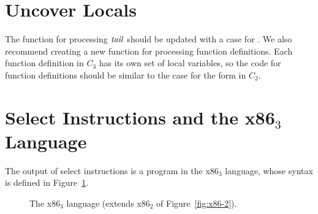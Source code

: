 \documentclass[11pt]{book}
\newcommand{\gray}[1]{{\color{gray} #1}}
\begin{document}
\section{Uncover Locals}
\label{sec:uncover-locals-r4}

The function for processing $\mathit{tail}$ should be updated with a case for
. We also recommend creating a new function for
processing function definitions. Each function definition in $C_3$ has
its own set of local variables, so the code for function definitions
should be similar to the case for the  form in $C_2$.

\section{Select Instructions and the x86$_3$ Language}
\label{sec:select-r4}

The output of select instructions is a program in the x86$_3$
language, whose syntax is defined in Figure~\ref{fig:x86-3}.

\begin{figure}[tp]
\fbox{
\begin{minipage}{0.96\textwidth}
\[
\begin{array}{lcl}
\Arg &::=&  \gray{  \INT{\Int} \mid \REG{\Reg}
    \mid (\key{deref}\,\Reg\,\Int) } \\
   &\mid& \gray{ (\key{byte-reg}\; \Reg) 
    \mid   (\key{global-value}\; \itm{name})  } \\
   &\mid& (\key{fun-ref}\; \itm{label})\\
\itm{cc} & ::= & \gray{  \key{e} \mid \key{l} \mid \key{le} \mid \key{g} \mid \key{ge}  } \\
\Instr &::=& \gray{  (\key{addq} \; \Arg\; \Arg) \mid
             (\key{subq} \; \Arg\; \Arg) \mid
             (\key{negq} \; \Arg) \mid (\key{movq} \; \Arg\; \Arg)  } \\
      &\mid& \gray{  (\key{callq} \; \mathit{label}) \mid
             (\key{pushq}\;\Arg) \mid
             (\key{popq}\;\Arg) \mid
             (\key{retq})  } \\
       &\mid& \gray{  (\key{xorq} \; \Arg\;\Arg)
       \mid (\key{cmpq} \; \Arg\; \Arg) \mid (\key{set}\itm{cc} \; \Arg)  } \\
       &\mid& \gray{  (\key{movzbq}\;\Arg\;\Arg)
       \mid  (\key{jmp} \; \itm{label})
       \mid (\key{j}\itm{cc} \; \itm{label})
       \mid (\key{label} \; \itm{label})  } \\
     &\mid& (\key{indirect-callq}\;\Arg ) \mid (\key{tail-jmp}\;\Arg) \\
     &\mid& (\key{leaq}\;\Arg\;\Arg)\\
\Block &::= & \gray{(\key{block} \;\itm{info}\; \Instr^{+})} \\
\Def &::= & (\key{define} \; (\itm{label}) \;\itm{info}\; ((\itm{label} \,\key{.}\, \Block)^{+}))\\
x86_3 &::= & (\key{program} \;\itm{info} \;\Def^{*})
\end{array}
\]
\end{minipage}
}
\caption{The x86$_3$ language (extends x86$_2$ of Figure~\ref{fig:x86-2}).}
\label{fig:x86-3}
\end{figure}
\end{document}
